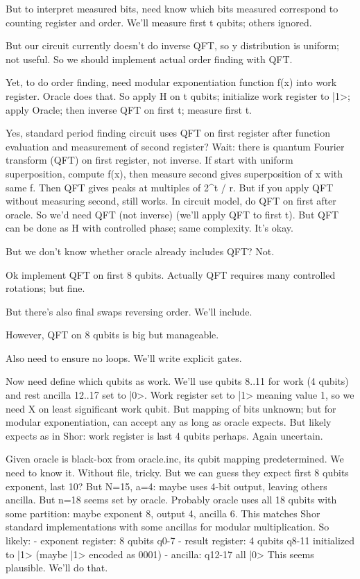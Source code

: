 \begin{decodedreasoningpanel}
But to interpret measured bits, need know which bits measured correspond to counting register and order. We'll measure first t qubits; others ignored.

But our circuit currently doesn't do inverse QFT, so y distribution is uniform; not useful. So we should implement actual order finding with QFT.

Yet, to do order finding, need modular exponentiation function f(x) into work register. Oracle does that. So apply H on t qubits; initialize work register to |1>; apply Oracle; then inverse QFT on first t; measure first t.

Yes, standard period finding circuit uses QFT on first register after function evaluation and measurement of second register? Wait: there is quantum Fourier transform (QFT) on first register, not inverse. If start with uniform superposition, compute f(x), then measure second gives superposition of x with same f. Then QFT gives peaks at multiples of 2\textasciicircum{}t / r. But if you apply QFT without measuring second, still works. In circuit model, do QFT on first after oracle. So we'd need QFT (not inverse) (we'll apply QFT to first t). But QFT can be done as H with controlled phase; same complexity. It's okay.

But we don't know whether oracle already includes QFT? Not.

Ok implement QFT on first 8 qubits. Actually QFT requires many controlled rotations; but fine.

But there's also final swaps reversing order. We'll include.

However, QFT on 8 qubits is big but manageable.

Also need to ensure no loops. We'll write explicit gates.

Now need define which qubits as work. We'll use qubits 8..11 for work (4 qubits) and rest ancilla 12..17 set to |0>. Work register set to |1> meaning value 1, so we need X on least significant work qubit. But mapping of bits unknown; but for modular exponentiation, can accept any as long as oracle expects. But likely expects as in Shor: work register is last 4 qubits perhaps. Again uncertain.

Given oracle is black-box from oracle.inc, its qubit mapping predetermined. We need to know it. Without file, tricky. But we can guess they expect first 8 qubits exponent, last 10? But N=15, a=4: maybe uses 4-bit output, leaving others ancilla. But n=18 seems set by oracle. Probably oracle uses all 18 qubits with some partition: maybe exponent 8, output 4, ancilla 6. This matches Shor standard implementations with some ancillas for modular multiplication. So likely:
- exponent register: 8 qubits q0-7
- result register: 4 qubits q8-11 initialized to |1> (maybe |1> encoded as 0001)
- ancilla: q12-17 all |0>
This seems plausible. We'll do that.


\end{decodedreasoningpanel}
